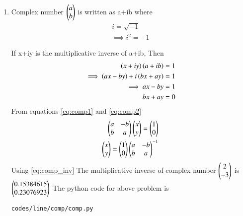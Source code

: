 \renewcommand{\theequation}{\theenumi}
\begin{enumerate}[label=\thesection.\arabic*.,ref=\thesection.\theenumi]

\item Complex number $\begin{pmatrix}a\\b\end{pmatrix}$ is written as a+ib where 
\begin{align}
i=\sqrt{-1}
\\
\implies i^{2}=-1
\end{align}

If x+iy is the multiplicative inverse of  a+ib, Then
\begin{align}
\left(x+iy\right)\left(a+ib\right)=1
\\
\implies \left(ax-by\right)+i\left(bx+ay\right)=1
\\
\implies ax-by=1
\label{eq:comp1}
\\
bx+ay=0
\label{eq:comp2}
\end{align}
From equations \ref{eq:comp1} and \ref{eq:comp2}
\begin {align}
 \begin{pmatrix}a&-b\\b&a\end{pmatrix}\begin{pmatrix}x\\y\end{pmatrix}=\begin{pmatrix}1\\0\end{pmatrix}
\\
\begin{pmatrix}x\\y\end{pmatrix}=\begin{pmatrix}1\\0\end{pmatrix}{\ensuremath{\begin{pmatrix}a&-b\\b&a\end{pmatrix}}}^{-1}
\label{eq:comp_inv}
\end{align}
Using \ref{eq:comp_inv} The multiplicative inverse of complex number $\begin{pmatrix}2\\-3\end{pmatrix}$ is $\begin{pmatrix}0.15384615\\0.23076923\end{pmatrix}$
\newline
The python code for above problem is
\begin{lstlisting}
codes/line/comp/comp.py
\end{lstlisting}
\end{enumerate}

